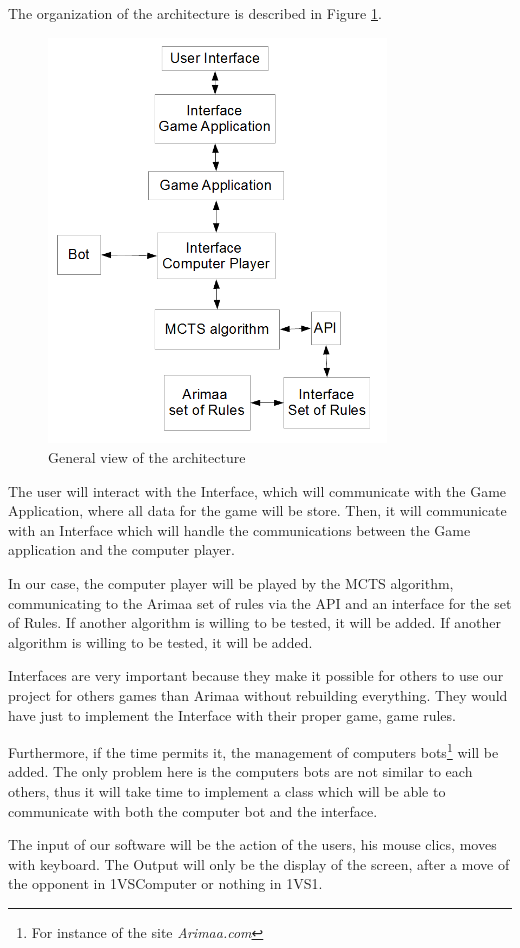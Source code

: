 The organization of the architecture is described in Figure \ref{fig:gen}.

\begin{figure}[!h]
\centering
\includegraphics[width=0.8\textwidth]{2General_Architecture/2.1.2GeneralView/gen.png}
\caption{General view of the architecture}
\label{fig:gen}
\end{figure}

The user will interact with the Interface, which will communicate with the Game Application, where all data for the game will be store. Then, it will communicate with an Interface which will handle the communications between the Game application and the computer player. 

In our case, the computer player will be played by the MCTS algorithm, communicating to the Arimaa set of rules via the API and an interface for the set of Rules.  If another algorithm is willing to be tested, it will be added.  If another algorithm is willing to be tested, it will be added.

Interfaces are very important because they make it possible for others to use our project for others games than Arimaa without rebuilding everything. They would have just to implement the Interface with their proper game, game rules.

Furthermore, if the time permits it, the management of computers bots\footnote{For instance of the site \textit{Arimaa.com}} will be added. The only problem here is the computers bots are not similar to each others, thus it will take time to implement a class which will be able to communicate with both the computer bot and the interface.

The input of our software will be the action of the users, his mouse clics, moves with keyboard. The Output will only be the display of the screen, after a move of the opponent in 1VSComputer or nothing in 1VS1.